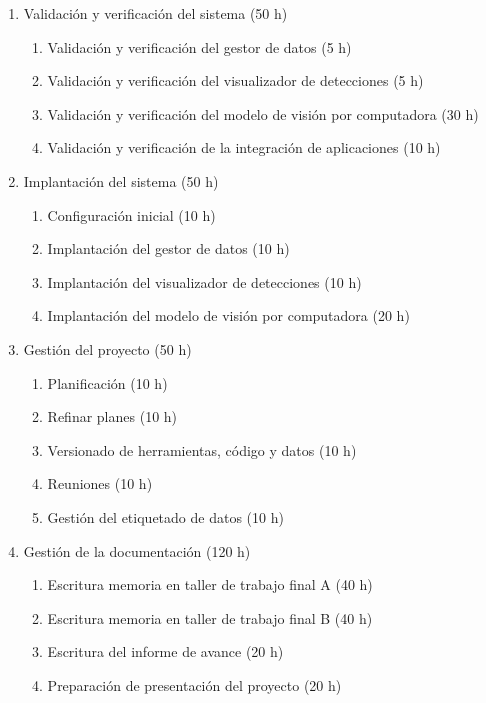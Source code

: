\documentclass[
11pt, %
]{charter}
\begin{document}
\begin{enumerate}
  \item Validación y verificación del sistema (50 h)
        \begin{enumerate}
          \item Validación y verificación del gestor de datos (5 h)
          \item Validación y verificación del visualizador de detecciones (5 h)
          \item Validación y verificación del modelo de visión por computadora (30 h)
          \item Validación y verificación de la integración de aplicaciones (10 h)
        \end{enumerate}

  \item Implantación del sistema (50 h)
        \begin{enumerate}
          \item Configuración inicial (10 h)
          \item Implantación del gestor de datos (10 h)
          \item Implantación del visualizador de detecciones (10 h)
          \item Implantación del modelo de visión por computadora (20 h)
        \end{enumerate}

  \item Gestión del proyecto (50 h)
        \begin{enumerate}
          \item Planificación (10 h)
          \item Refinar planes (10 h)
          \item Versionado de herramientas, código y datos (10 h)
          \item Reuniones (10 h)
          \item Gestión del etiquetado de datos (10 h)
        \end{enumerate}

  \item Gestión de la documentación (120 h)
        \begin{enumerate}
          \item Escritura memoria en taller de trabajo final A (40 h)
          \item Escritura memoria en taller de trabajo final B (40 h)
          \item Escritura del informe de avance (20 h)
          \item Preparación de presentación del proyecto (20 h)
        \end{enumerate}

\end{enumerate}
\end{document}
